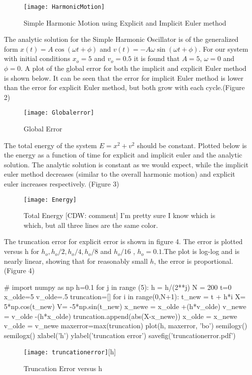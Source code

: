 \documentclass{article}
\newcommand{\cdw}[1]
           {{\color{blue} [CDW: comment] #1}}
\begin{document}
\begin{figure}[h]
\texttt{[image: HarmonicMotion]}
\caption{Simple Harmonic Motion using Explicit and Implicit Euler method}
\end{figure}

The analytic solution for the Simple Harmonic Oscillator is of the generalized form $ x(t) = A \cos( \omega t + \phi)$ and $ v(t) = -A \omega \sin( \omega t + \phi)$. For our system with initial conditions $x_o = 5$ and $v_o = 0.5$ it is found that  $A=5$, $\omega = 0$ and $ \phi = 0$. A plot of the global error for both the implicit and explicit Euler method is shown below. 
It can be seen that the error for implicit Euler method is lower than the error for explicit Euler method, but both grow with each cycle.(Figure 2)
\begin{figure}[h]
\texttt{[image: Globalerror]}
\caption{Global Error}
\end{figure}
The total energy of the system $E = x^2 + v^2$ should be constant. Plotted below is the energy as a function of time for explicit and implicit euler and the analytic solution. The analytic solution is constant as we would expect, while the implicit euler method decreases (similar to the overall harmonic motion) and explicit euler increases respectively. (Figure 3)
\begin{figure}[h]
\texttt{[image: Energy]}
\caption{Total Energy\cdw{I'm pretty sure I know which is which, but all three lines are the same color.}}
\end{figure}

The truncation error for explicit error is shown in figure 4. The error is plotted versus h for $h_o, h_o/2, h_o/4, h_o/8$ and $ h_o/16$ , $h_o=0.1$.The plot is log-log and is nearly linear, showing that for reasonably small $h$, the error is proportional. (Figure 4)




\begin{pylabcode}[secondsession]
#
import numpy as np
h=0.1
for j in range (5):
	h = h/(2**j)
	N = 200
	t=0
	x_olde=5
	v_olde=.5
	truncation=[]
	for i in range(0,N+1): 
		t_new = t + h*i
		X= 5*np.cos(t_new)
		V= -5*np.sin(t_new)
		x_newe = x_olde +(h*v_olde)
		v_newe = v_olde -(h*x_olde)
		truncation.append(abs(X-x_newe))
       		x_olde = x_newe
       		v_olde = v_newe
	maxerror=max(truncation)
	plot(h, maxerror, 'bo')   
semilogy()
semilogx()
xlabel('h')
ylabel('truncation error')
savefig('truncationerror.pdf') 
\end{pylabcode}
\begin{figure}
\texttt{[image: truncationerror]}[h]
\caption{Truncation Error versus h}
\end{figure}
\end{document}
